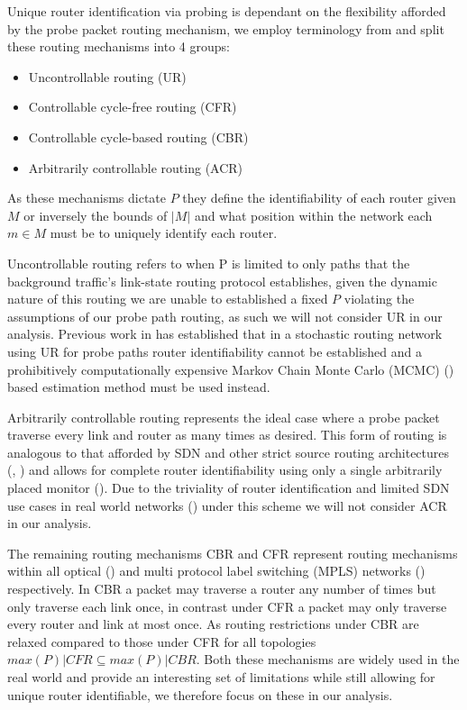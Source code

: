     Unique router identification via probing is dependant on the flexibility afforded by the probe packet routing mechanism, we employ terminology from \cite{he_network_2021} and split these routing mechanisms into 4 groups: \begin{itemize}
        \item Uncontrollable routing (UR)
        \item Controllable cycle-free routing (CFR)
        \item Controllable cycle-based routing (CBR)
        \item Arbitrarily controllable routing (ACR)
    \end{itemize}As these mechanisms dictate $P$ they define the identifiability of each router given $M$ or inversely the bounds of $|M|$ and what position within the network each $m\in M$ must be to uniquely identify each router.\par
    Uncontrollable routing refers to when P is limited to only paths that the background traffic's link-state routing protocol establishes, given the dynamic nature of this routing we are unable to established a fixed $P$ violating the assumptions of our probe path routing, as such we will not consider UR in our analysis. Previous work in \cite{barnes_stochastic_2020} has established that in a stochastic routing network using UR for probe paths router identifiability cannot be established and a prohibitively computationally expensive Markov Chain Monte Carlo (MCMC) (\cite{dellaportas_bayesian_2002}) based estimation method must be used instead.\par
    
    Arbitrarily controllable routing represents the ideal case where a probe packet traverse every link and router as many times as desired. This form of routing is analogous to that afforded by SDN and other strict source routing architectures (\cite{university_of_southern_california_darpa_1981}, \cite{open_networking_foundation_openflow_2015}) and allows for complete router identifiability using only a single arbitrarily placed monitor (\cite{he_network_2021}). Due to the triviality of router identification and limited SDN use cases in real world networks (\cite{jarschel_interfaces_2014}) under this scheme we will not consider ACR in our analysis.\par
    The remaining routing mechanisms CBR and CFR represent routing mechanisms within all optical (\cite{ahuja_srlg_2011}) and multi protocol label switching (MPLS) networks (\cite{rosen_multiprotocol_2001}) respectively. In CBR a packet may traverse a router any number of times but only traverse each link once, in contrast under CFR a packet may only traverse every router and link at most once. As routing restrictions under CBR are relaxed compared to those under CFR for all topologies $max(P)|CFR \subseteq max(P)|CBR$. Both these mechanisms are widely used in the real world and provide an interesting set of limitations while still allowing for unique router identifiable, we therefore focus on these in our analysis.

